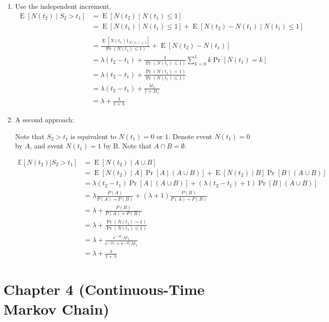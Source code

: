 \documentclass[  11pt]{article}
\newcommand{\p}{ {\Pr}}
\newcommand{\e}{ \operatorname{E}}
\newcommand{\la}{\lambda}
\begin{document}
\begin{ExerciseList}
\begin{enumerate}
\begin{enumerate}
\item Use the independent increment,  
\[\begin{split}
\e[N(t_2) \mid S_2 > t_1] & = \e [N(t_2)\mid N(t_1)\le 1] \\
 & = \e [N(t_1)\mid N(t_1)\le 1]  +    \e [N(t_2)-N(t_1)\mid N(t_1)\le 1] \\\\
& = \frac{\e[N(t_1)1_{N(t_1)\le 1}]}{\p(N(t_1)\le 1)} +  \e [N(t_2)-N(t_1) ]\\
& = \lambda (t_2-t_1)+ \frac{1}{\p(N(t_1)\le 1)}\sum_{k=0}^{1} k\p[N(t_1)=k] \\
& = \lambda (t_2-t_1) + \frac{\p(N(t_1)=1)}{\p (N(t_1)\le 1)} \\
& = \lambda (t_2-t_1) + \frac{\la t_1}{1+\la t_1}\\
& = \la + \frac{\la}{1+\la}
\end{split}\]

\item  A second approach: 

Note that $S_2 > t_1 $ is equivalent to $ N(t_1) = 0 \text{ or } 1$.
Denote event $N(t_1) = 0$ by $A$, and event $N(t_1) = 1$ by B.
Note that $A\cap B=\emptyset$.\par
\[\begin{split}
\mathbb{E}[N(t_2) | S_2 >t_1] & = \e[N(t_2)\mid A\cup B] \\
& = \e[N(t_2)\mid A]\p[A\mid (A\cup B)]+ \e[N(t_2)\mid B]\p[B\mid (A\cup B)] \\
& = \la (t_2-t_1)\p[A\mid (A\cup B)] + (\la (t_2-t_1)+1)\p[B\mid (A\cup B)] \\
& = \la    \frac{P(A)}{P(A)+P(B)} + (\la +1) \frac{P(B)}{P(A)+P(B)} \\
& = \la  +  \frac{P(B)}{P(A)+P(B)} \\
&= \la + \frac{\p(N(t_1)=1)}{\p(N(t_1)\leq 1)}\\
& = \la + \frac{e^{-\la t_1}\la t_1}{e^{-\la t_1}+e^{-\la t_1} \la t_1}\\
& = \la + \frac{\la}{1+\la}
\end{split}\]

\end{enumerate}


\end{enumerate}


\end{ExerciseList}




\newpage
\section*{Chapter 4  (Continuous-Time Markov Chain)}
 \setcounter{Exercise}{0}
\end{document}
